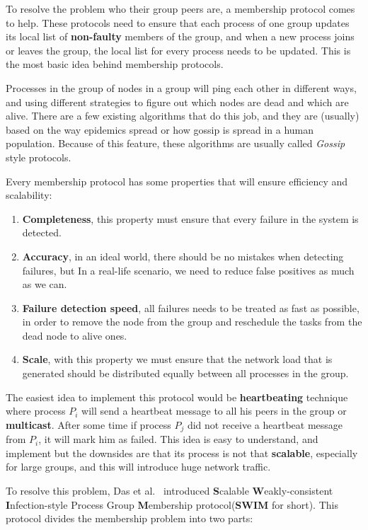 To resolve the problem who their group peers are, a membership protocol comes to help. These protocols need to ensure that each process of one group updates its local list of \textbf{non-faulty} members of the group, and when a new process joins or leaves the group, the local list for every process needs to be updated. This is the most basic idea behind membership protocols.

Processes in the group of nodes in a group will ping each other in different ways, and using different strategies to figure out which nodes are dead and which are alive. There are a few existing algorithms that do this job, and they are (usually) based on the way epidemics spread or how gossip is spread in a human population. Because of this feature, these algorithms are usually called \textit{Gossip} style protocols.

Every membership protocol has some properties that will ensure efficiency and scalability:

\begin{enumerate}[start=1,label={(\bfseries \arabic*)}] \label{ds:features}
	\item \textbf{Completeness}, this property must ensure that every failure in the system is detected.
	\item \textbf{Accuracy}, in an ideal world, there should be no mistakes when detecting failures, but In a real-life scenario, we need to reduce false positives as much as we can.
	\item \textbf{Failure detection speed}, all failures needs to be treated as fast as possible, in order to remove the node from the group and reschedule the tasks from the dead node to alive ones.
	\item \textbf{Scale}, with this property we must ensure that the network load that is generated should be distributed equally between all processes in the group.
\end{enumerate}

\noindent
The easiest idea to implement this protocol would be \textbf{heartbeating} technique where process $P_i$ will send a heartbeat message to all his peers in the group or \textbf{multicast}. After some time if process $P_j$ did not receive a heartbeat message from $P_i$, it will mark him as failed. This idea is easy to understand, and implement but the downsides are that its process is not that \textbf{scalable}, especially for large groups, and this will introduce huge network traffic.

To resolve this problem, Das et al.~\cite{DasGM02} introduced \textbf{S}calable \textbf{W}eakly-consistent \textbf{I}nfection-style Process Group \textbf{M}embership protocol\newline (\textbf{SWIM} for short)\label{swim}. 
\noindent
This protocol divides the membership problem into two parts:

